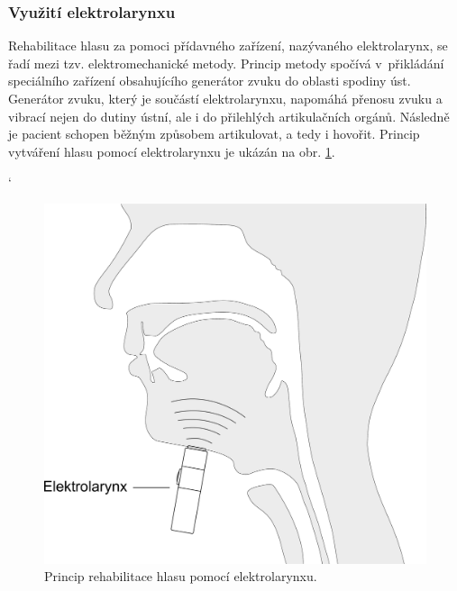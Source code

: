 
\subsubsection{Využití elektrolarynxu} %
\label{chap:cause:treatment:foniatric:elektrolarynx}

Rehabilitace hlasu za pomoci přídavného zařízení, nazývaného elektrolarynx, se řadí mezi tzv. elektromechanické
metody. Princip metody spočívá v~přikládání speciálního zařízení obsahujícího generátor zvuku do oblasti spodiny úst. Generátor zvuku, který je součástí elektrolarynxu, napomáhá přenosu zvuku a vibrací nejen do dutiny ústní, ale i do přilehlých artikulačních orgánů. Následně je pacient schopen běžným způsobem artikulovat, a tedy i hovořit. Princip vytváření hlasu pomocí elektrolarynxu je ukázán na obr. \ref{fig:cause:treatment:electrolarynx}.



`%

\begin{figure}[htb]
  \begin{center}
    \includegraphics[width=0.6\linewidth]{ch3-cause/figures/electrolarynx}
    \caption[Princip rehabilitace hlasu pomocí elektrolarynxu.]{Princip rehabilitace hlasu pomocí elektrolarynxu.}
    \label{fig:cause:treatment:electrolarynx}
  \end{center}
\end{figure}

